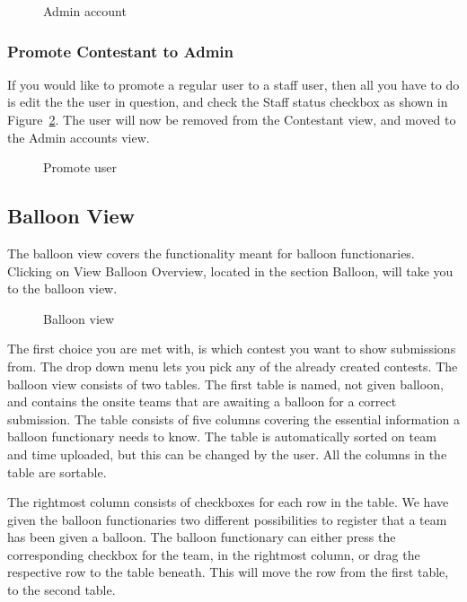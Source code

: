 \begin{figure}
\centering
	\caption{Admin account}
	\label{fig:createAdmin}
\end{figure}

\subsubsection{Promote Contestant to Admin}

If you would like to promote a regular user to a staff user, then all
you have to do is edit the the user in question, and check the Staff
status checkbox as shown in Figure~\ref{fig:promoteUser}. The user will now be removed
from the Contestant view, and moved to the Admin accounts view. 

\begin{figure}
\centering
	\caption{Promote user}
	\label{fig:promoteUser}
\end{figure}


\subsection{Balloon View}

The balloon view covers the functionality meant for balloon
functionaries. Clicking on View Balloon Overview, located in the
section Balloon, will take you to the balloon view. 

\begin{figure}
\centering
	\caption{Balloon view}
	\label{fig:balloonView}
\end{figure}

The first choice you are met with, is which contest you want to show
submissions from. The drop down menu lets you pick any of the already
created contests. The balloon view consists of two tables. The first
table is named, not given balloon, and contains the onsite teams that
are awaiting a balloon for a correct submission. The table consists of
five columns covering the essential information a balloon functionary
needs to know. The table is automatically sorted on team and time
uploaded, but this can be changed by the user. All the columns in the
table are sortable.

The rightmost column consists of checkboxes for each row in the table.
We have given the balloon functionaries two different possibilities to
register that a team has been given a balloon. The balloon functionary
can either press the corresponding checkbox for the team, in the
rightmost column, or drag the respective row to the table beneath. This
will move the row from the first table, to the second table.

